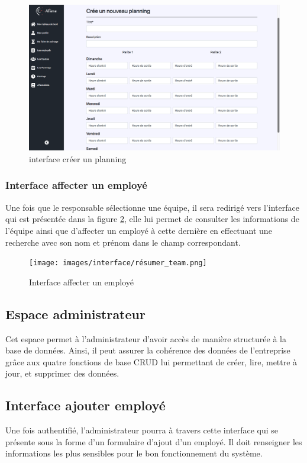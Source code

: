 \begin{figure}[h!]
    \vspace{-10pt}
    \centering
    \includegraphics[scale=0.305 ]{images/interface/add_planning.png}
    \caption{interface créer un planning}
    \label{fig99}
\end{figure}

\vspace{-20pt}
\subsubsection*{Interface affecter un employé}
Une fois que le responsable sélectionne une équipe, il sera redirigé vers
l'interface qui est présentée dans la figure \ref{fig100}, elle lui permet de
consulter les informations de l'équipe ainsi que d'affecter un employé à cette
dernière en effectuant une recherche avec son nom et prénom dans le champ
correspondant. 

\begin{figure}[h!]
    \centering
    \texttt{[image: images/interface/résumer\_team.png]}
    \caption{Interface affecter un employé}
    \label{fig100}
\end{figure}

\clearpage

\subsection{Espace administrateur}
Cet espace permet à l’administrateur d’avoir accès de manière structurée à la 
base de données. Ainsi, il peut assurer la cohérence des données de l’entreprise 
grâce aux quatre fonctions de base CRUD lui permettant de créer, lire, mettre à 
jour, et supprimer des données.

\subsection*{Interface ajouter employé}
Une fois authentifié, l’administrateur pourra à travers cette interface qui se
présente sous la forme d’un formulaire d'ajout d'un employé. Il doit renseigner
les informations les plus sensibles pour le bon fonctionnement du système.  

